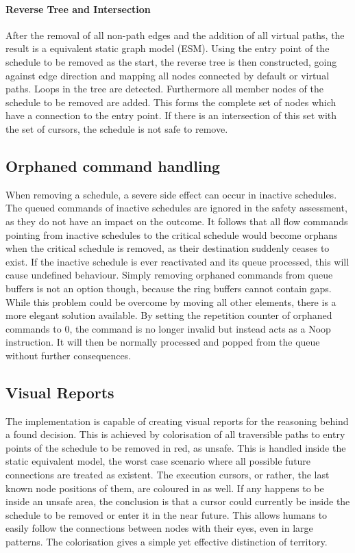\paragraph{Reverse Tree and Intersection}
After the removal of all non-path edges and the addition of all virtual paths, the result is a equivalent static graph model (ESM). Using the entry point of the schedule to be removed as the start,
the reverse tree is then constructed, going against edge direction and mapping all nodes connected by default or virtual paths. Loops in the tree are detected. Furthermore all member nodes of the schedule to be removed are added. This forms the complete set of nodes which have a connection to the entry point. If there is an intersection of this set with the set of cursors, the schedule is not safe to remove.

\subsection{Orphaned command handling}
When removing a schedule, a severe side effect can occur in inactive schedules. The queued commands of inactive schedules are ignored in the safety assessment, as they do not have an impact on the outcome. It follows that all flow commands pointing from inactive schedules to the critical schedule would become orphans when the critical schedule is removed, as their destination suddenly ceases to exist. If the inactive schedule is ever reactivated and its queue processed, this will cause undefined behaviour. Simply removing orphaned commands from queue buffers is not an option though, because the ring buffers cannot contain gaps. While this problem could be overcome by moving all other elements, there is a more elegant solution available. By setting the repetition counter of orphaned commands to 0, the command is no longer invalid but instead acts as a Noop instruction. It will then be normally processed and popped from the queue without further consequences.


\subsection{Visual Reports}
The implementation is capable of creating visual reports for the reasoning behind a found decision. This is achieved by colorisation of all traversible paths to entry points of the schedule to be removed in red, as unsafe. This is handled inside the static equivalent model, the worst case scenario where all possible future connections are treated as existent. The execution cursors, or rather, the last known node positions of them, are coloured in as well. If any happens to be inside an unsafe area, the conclusion is that a cursor could currently be inside the schedule to be removed or enter it in the near future. This allows humans to easily follow the connections between nodes with their eyes, even in large patterns. The colorisation gives a simple yet effective distinction of territory.


